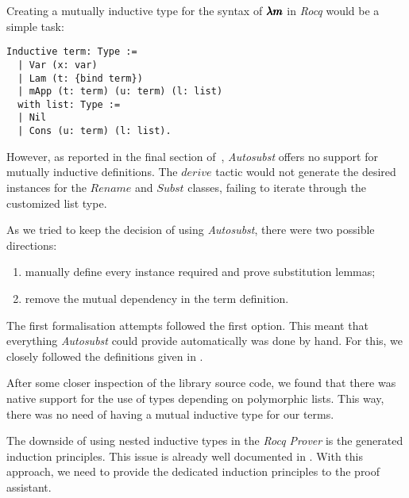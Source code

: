 Creating a mutually inductive type for the syntax of $\pmb{\lambda m}$ in \textit{Rocq} would be a simple task:
\begin{lstlisting}[language=Coq]
  Inductive term: Type :=
  | Var (x: var)
  | Lam (t: {bind term})
  | mApp (t: term) (u: term) (l: list)
  with list: Type :=
  | Nil
  | Cons (u: term) (l: list). 
\end{lstlisting}

However, as reported in the final section of~\cite{AutosubstSchafer}, \textit{Autosubst} offers no support for mutually inductive definitions.
The \lst$derive$ tactic would not generate the desired instances for the \lst$Rename$ and \lst$Subst$ classes, failing to iterate through the customized list type.

As we tried to keep the decision of using \textit{Autosubst}, there were two possible directions:
\begin{enumerate}
\item manually define every instance required and prove substitution lemmas;
\item remove the mutual dependency in the term definition.
\end{enumerate}

The first formalisation attempts followed the first option.
This meant that everything \textit{Autosubst} could provide automatically was done by hand.
For this, we closely followed the definitions given in \cite{AutosubstSchafer}.


After some closer inspection of the library source code, we found that there was native support for the use of types depending on polymorphic lists.
This way, there was no need of having a mutual inductive type for our terms.


The downside of using nested inductive types in the \textit{Rocq Prover} is the generated induction principles.
This issue is already well documented in \cite[Chapter~14.3]{CoqArt}.
With this approach, we need to provide the dedicated induction principles to the proof assistant.

